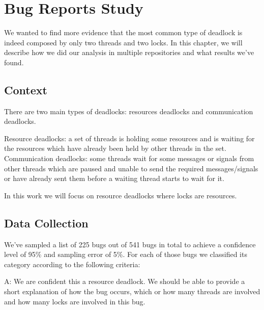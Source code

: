 \chapter{Bug Reports Study}

We wanted to find more evidence that the most common type of deadlock is indeed composed by only two threads and two locks. In this chapter, we will describe how we did our analysis in multiple repositories and what results we've found.

\section{Context}


There are two main types of deadlocks: resources deadlocks and communication deadlocks.

Resource deadlocks: a set of threads is holding some resources and is waiting for the resources which have already been held by other threads in the set.
Communication deadlocks: some threads wait for some messages or signals from other threads which are paused and unable to send the required messages/signals or have already sent them before a waiting thread starts to wait for it.

In this work we will focus on resource deadlocks where locks are resources.


\section{Data Collection}





We've sampled a list of 225 bugs out of 541 bugs in total to achieve a confidence level of 95\% and sampling error of 5\%. For each of those bugs we classified its category according to the following criteria:

A: We are confident this a resource deadlock. We should be able to provide a short explanation of how the bug occurs, which or how many threads are involved and how many locks are involved in this bug.

